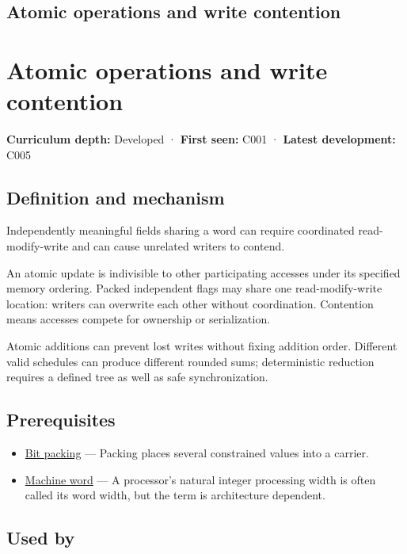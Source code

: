 \hypertarget{appendix-e12d1b03fefb}{}
\section*{Atomic operations and write contention}
\chapter{Atomic operations and write contention}\label{appendix-e12d1b03fefb-atomic-operations-and-write-contention}

\textbf{Curriculum depth:} Developed · \textbf{First seen:} C001 · \textbf{Latest development:} C005

\section{Definition and mechanism}\label{appendix-e12d1b03fefb-definition-and-mechanism}

Independently meaningful fields sharing a word can require coordinated read-modify-write and can cause unrelated writers to contend.

An atomic update is indivisible to other participating accesses under its specified memory ordering. Packed independent flags may share one read-modify-write location: writers can overwrite each other without coordination. Contention means accesses compete for ownership or serialization.

Atomic additions can prevent lost writes without fixing addition order. Different valid schedules can produce different rounded sums; deterministic reduction requires a defined tree as well as safe synchronization.

\section{Prerequisites}\label{appendix-e12d1b03fefb-prerequisites}

\begin{itemize}
\tightlist
\item
  \hyperref[appendix-1f9963e1a5d1]{Bit packing} --- Packing places several constrained values into a carrier.
\item
  \hyperref[appendix-d67a19507dc5]{Machine word} --- A processor's natural integer processing width is often called its word width, but the term is architecture dependent.
\end{itemize}

\section{Used by}\label{appendix-e12d1b03fefb-used-by}

